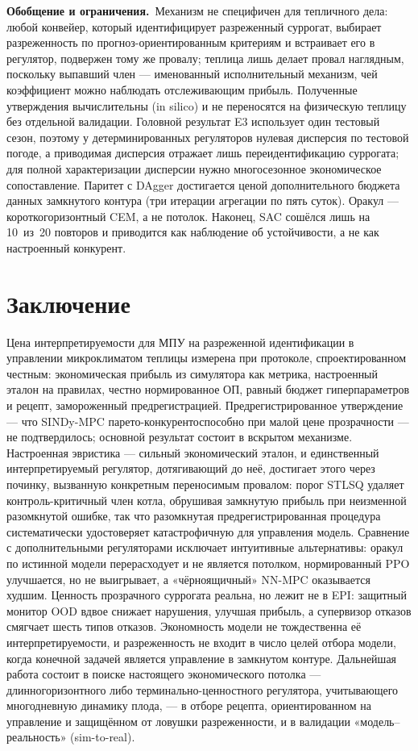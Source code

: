 \documentclass[preprint,3p]{elsarticle}
\begin{document}
\textbf{Обобщение и ограничения.}~Механизм не специфичен для тепличного дела: любой конвейер,
который идентифицирует разреженный суррогат, выбирает разреженность по прогноз-ориентированным
критериям и встраивает его в регулятор, подвержен тому же провалу; теплица лишь делает провал
наглядным, поскольку выпавший член — именованный исполнительный механизм, чей коэффициент можно
наблюдать отслеживающим прибыль. Полученные утверждения вычислительны (in silico) и не
переносятся на физическую теплицу без отдельной валидации. Головной результат E3 использует один
тестовый сезон, поэтому у детерминированных регуляторов нулевая дисперсия по тестовой погоде, а
приводимая дисперсия отражает лишь переидентификацию суррогата; для полной характеризации
дисперсии нужно многосезонное экономическое сопоставление. Паритет с DAgger достигается ценой
дополнительного бюджета данных замкнутого контура (три итерации агрегации по пять суток). Оракул —
короткогоризонтный CEM, а не потолок. Наконец, SAC сошёлся лишь на
10~из~20 повторов и приводится как наблюдение об устойчивости, а не как настроенный конкурент.

\section{Заключение}
\label{sec:conclusions}

Цена интерпретируемости для МПУ на разреженной идентификации в управлении микроклиматом теплицы
измерена при протоколе, спроектированном честным: экономическая прибыль из симулятора как
метрика, настроенный эталон на правилах, честно нормированное ОП, равный бюджет гиперпараметров и
рецепт, замороженный предрегистрацией. Предрегистрированное утверждение — что SINDy-MPC
парето-конкурентоспособно при малой цене прозрачности — не подтвердилось; основной результат
состоит в вскрытом механизме. Настроенная эвристика — сильный экономический эталон, и
единственный интерпретируемый регулятор, дотягивающий до неё, достигает этого через починку,
вызванную конкретным переносимым провалом: порог STLSQ удаляет контроль-критичный член котла,
обрушивая замкнутую прибыль при неизменной разомкнутой ошибке, так что разомкнутая
предрегистрированная процедура систематически удостоверяет катастрофичную для управления модель.
Сравнение с дополнительными регуляторами исключает интуитивные альтернативы: оракул по истинной
модели перерасходует и не является потолком, нормированный PPO улучшается, но не выигрывает, а
«чёрноящичный» NN-MPC оказывается худшим. Ценность прозрачного суррогата реальна, но лежит не в
EPI: защитный монитор OOD вдвое снижает нарушения, улучшая прибыль, а супервизор отказов смягчает
шесть типов отказов. Экономность модели не тождественна её интерпретируемости, и разреженность
не входит в число целей отбора модели, когда конечной задачей является управление в замкнутом
контуре. Дальнейшая работа состоит в поиске настоящего экономического потолка —
длинногоризонтного либо терминально-ценностного регулятора, учитывающего многодневную динамику
плода, — в отборе рецепта, ориентированном на управление и защищённом от ловушки разреженности, и
в валидации «модель--реальность» (sim-to-real).
\end{document}
